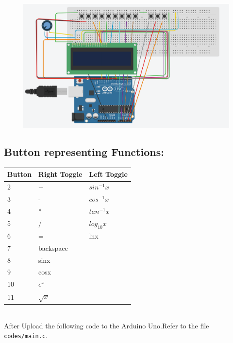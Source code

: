 \documentclass[journal]{IEEEtran}
\begin{document}
\begin{figure}[H]
    \centering
    \includegraphics[width=0.8\linewidth]{figs/calcicircuit.png}
\end{figure}
\subsection*{\textbf{Button representing Functions:}}
\begin{tabular}{|l|l|l|}
\hline
\textbf{Button} & \textbf{Right Toggle} & \textbf{Left Toggle} \\ \hline
     2 &  + & $sin^{-1}x$ \\ \hline
     3 &  - & $cos^{-1}x$ \\ \hline
     4 &  * & $tan^{-1}x$ \\ \hline
     5 &  / & $log_{10}x$ \\ \hline
     6 & = & lnx \\ \hline
     7 & backspace & \\ \hline
     8 & sinx & \\ \hline
     9 & cosx & \\ \hline
     10 & $e^x$ & \\ \hline
     11 & $\sqrt{x}$ & \\ \hline 
\end{tabular}\\
After Upload the following code to the Arduino Uno.Refer to the file \texttt{codes/main.c}.
\end{document}
